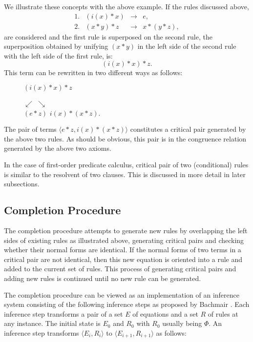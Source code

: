 We illustrate these concepts with the above example. If the rules 
discussed above,
\[\begin{array}{lrll}
  1. & (i(x) * x) & \rightarrow & e, \\
  2. & (x * y) * z & \rightarrow & x * (y * z),
\end{array}\]
are considered and the first rule is superposed on the second
rule, the superposition obtained by unifying $(x * y)$ in the
left side of the second rule with the left side of the first
rule, is: \[(i(x) * x) * z.\] This term can be rewritten in two
different ways as follows:
\begin{figure}[h]
\begin{center}
 $(i(x) * x) * z$
\end{center}
\vspace*{-.15in}
\hspace*{3.0in}$\swarrow$ \hspace{0.3in} $\searrow$ \\
\hspace*{2.7in}$(e * z)$ \hspace{.5in} $i(x) * (x * z).$
\end{figure}

The pair of terms $\langle e * z, i(x) * (x * z) \rangle$
constitutes a critical pair generated by the above two rules. As
should be obvious, this pair is in the congruence relation
generated by the above two axioms.

In the case of first-order predicate calculus, critical pair of
two (conditional) rules is similar to the resolvent of two
clauses. This is discussed in more detail in later subsections.

\subsection{Completion Procedure}

The completion procedure attempts to generate new rules by
overlapping the left sides of existing rules as illustrated
above, generating critical pairs and checking whether their
normal forms are identical.  If the normal forms of two terms in
a critical pair are not identical, then this new equation is
oriented into a rule and added to the current set of rules. This
process of generating critical pairs and adding new rules is
continued until no new rule can be generated.

The completion procedure can be viewed as an implementation of an
inference system consisting of the following inference steps as
proposed by Bachmair \cite{Bachmair}.  Each inference step
transforms a pair of a set $E$ of equations and a set $R$ of
rules at any instance. The initial state is $E_0$ and $R_0$ with
$R_0$ usually being $\Phi$. An inference step transforms $\langle
E_i, R_i \rangle$ to $\langle E_{i+1}, R_{i+1} \rangle$ as
follows:

